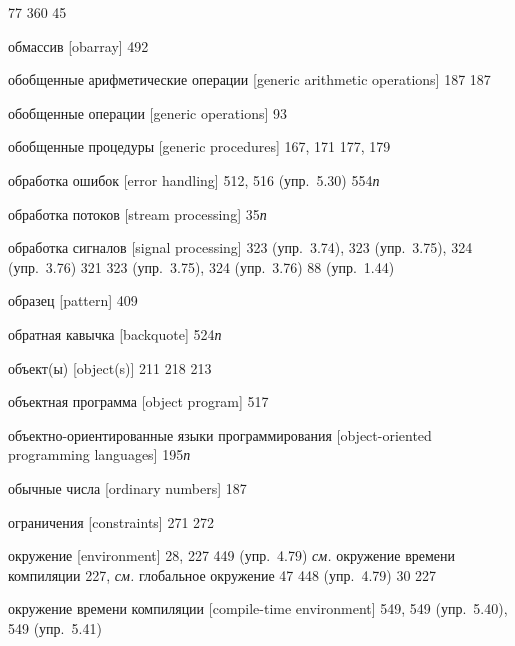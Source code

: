 \begin{theindex}
   77
   360
   45
\item {обмассив [obarray]} 492
\item {обобщенные арифметические операции [generic arithmetic operations]} 187
   187
\item {обобщенные операции [generic operations]} 93
\item {обобщенные процедуры [generic procedures]} 167, 171
   177, 179
\item {обработка ошибок [error handling]}
   512, 516 (упр.~5.30)
   554{\it п}
\item {обработка потоков [stream processing]} 35{\it п}
\item {обработка сигналов [signal processing]}
   323 (упр.~3.74), 323 (упр.~3.75), 324 (упр.~3.76)
   321
   323 (упр.~3.75), 324 (упр.~3.76)
   88 (упр.~1.44)
\item {образец [pattern]} 409
\item {обратная кавычка [backquote]} 524{\it п}
\item {объект(ы) [object(s)]} 211
   218
   213
\item {объектная программа [object program]} 517
\item {объектно-ориентированные языки программирования [object-oriented pro\-gram\-ming languages]} 195{\it п}
\item {обычные числа [ordinary numbers]}
   187
\item {ограничения [constraints]}
   271
   272
\item {окружение [environment]} 28, 227
   449 (упр.~4.79)
   {\it см.} окружение времени компиляции
   227, {\it см.} глобальное окружение
   47
   448 (упр.~4.79)
   30
   227
\item {окружение времени компиляции [compile-time environment]} 549, 549 (упр.~5.40), 549 (упр.~5.41)

\end{theindex}

